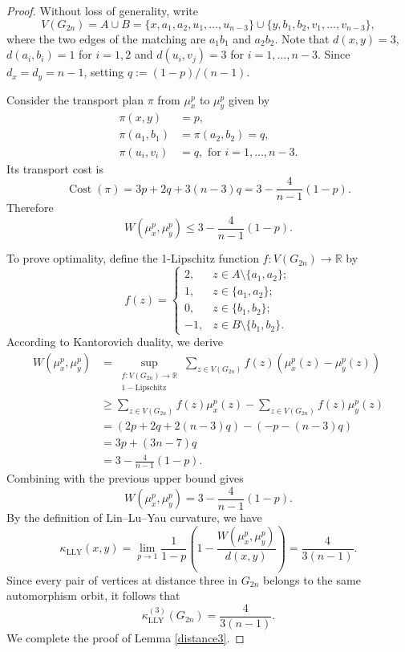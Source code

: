 \documentclass[11pt,bezier]{article}
\theoremstyle{definition}
\theoremstyle{definition}
\theoremstyle{nonumber}
\begin{document}
\begin{proof}
Without loss of generality, write $$V(G_{2n})=A\cup B=\{x,a_1,a_2,u_1,\ldots,u_{n-3}\}\cup \{y,b_1,b_2,v_1,\ldots,v_{n-3}\},$$ where the two edges of the matching are $a_1b_1$ and $a_2b_2$. 
Note that $d(x,y)=3$, $d(a_i,b_i)=1$ for $i=1,2$
and $d(u_i,v_j)=3$ for $i=1,\ldots,n-3$.
Since $d_x=d_y=n-1$, setting $q:=(1-p)/(n-1)$.

Consider the transport plan $\pi$ from $\mu_x^p$ to $\mu_y^p$ given by
\begin{align*} 
\pi(x,y)&=p,\\
\pi(a_1,b_1)&=\pi(a_2,b_2)=q,\\
\pi(u_i,v_i)&=q, \text{ for } i=1,\ldots,n-3.
\end{align*}
Its transport cost is
$$
\operatorname{Cost}(\pi)=3p+2q+3(n-3)q=3-\frac{4}{n-1}(1-p).
$$
Therefore
$$
W(\mu_x^p,\mu_y^p)\leq3-\frac{4}{n-1}(1-p).
$$

To prove optimality, define the 1-Lipschitz function $f:V(G_{2n})\to\mathbb{R}$ by 
$$
f(z)=
\begin{cases}
2, & z\in A\setminus\{a_1,a_2\};\\
1, & z\in\{a_1,a_2\};\\
0, & z\in\{b_1,b_2\};\\
-1, & z\in B\setminus\{b_1,b_2\}.
\end{cases}
$$
According to Kantorovich duality, we derive
\begin{align*}
W(\mu_x^p, \mu_y^p) &= \sup_{\substack{f: V(G_{2n}) \to \mathbb{R} \\ 1-\text{Lipschitz}}} \sum_{z \in V(G_{2n})} f(z) \left( \mu_x^p(z) - \mu_y^p(z) \right)\\
&\geq\sum_{z\in V(G_{2n})}f(z)\mu_x^p(z)
-\sum_{z\in V(G_{2n})}f(z)\mu_y^p(z)\\
&=\left(2p+2q+2(n-3)q\right)
-\left(-p-(n-3)q\right)\\
&=3p+(3n-7)q\\
&=3-\frac{4}{n-1}(1-p).
\end{align*}
Combining with the previous upper bound gives
$$
W(\mu_x^p,\mu_y^p)=3-\frac{4}{n-1}(1-p).
$$
By the definition of Lin--Lu--Yau curvature, we have
$$
\kappa_{\mathrm{LLY}}(x,y)=\lim_{p\to1}\frac{1}{1-p} \left( 1 - \frac{W(\mu_x^p, \mu_y^p)}{d(x, y)} \right)=\frac{4}{3(n-1)}.
$$
Since every pair of vertices at distance three in $G_{2n}$
belongs to the same automorphism orbit, it follows that
$$
\kappa_{\mathrm{LLY}}^{(3)}(G_{2n})=\frac{4}{3(n-1)}.
$$
We complete the proof of Lemma \ref{distance3}.
\end{proof}
\end{document}

